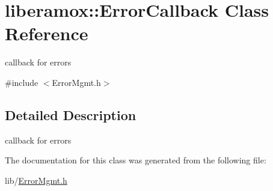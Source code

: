 \hypertarget{classliberamox_1_1ErrorCallback}{}\section{liberamox\+:\+:Error\+Callback Class Reference}
\label{classliberamox_1_1ErrorCallback}


callback for errors  




{\ttfamily \#include $<$Error\+Mgmt.\+h$>$}



\subsection{Detailed Description}
callback for errors 

The documentation for this class was generated from the following file\+:\begin{DoxyCompactItemize}
\item 
lib/\hyperlink{ErrorMgmt_8h}{Error\+Mgmt.\+h}\end{DoxyCompactItemize}
